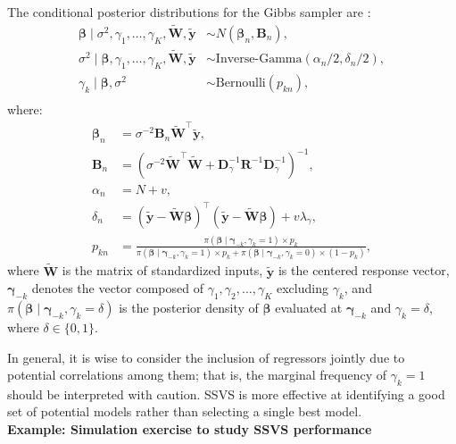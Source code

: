 The conditional posterior distributions for the Gibbs sampler are \cite{george1993variable}:
\begin{align*}
	\boldsymbol{\beta} \mid \sigma^2, \gamma_1, \dots, \gamma_K, \tilde{\mathbf{W}}, \tilde{\mathbf{y}} &\sim {N}(\boldsymbol{\beta}_n, \mathbf{B}_n), \\
	\sigma^2 \mid \boldsymbol{\beta}, \gamma_1, \dots, \gamma_K, \tilde{\mathbf{W}}, \tilde{\mathbf{y}} &\sim \text{Inverse-Gamma}(\alpha_n/2, \delta_n/2), \\
	\gamma_k \mid \boldsymbol{\beta}, \sigma^2 &\sim \text{Bernoulli}(p_{kn}),\\
\end{align*}
where:
\begin{align*}
	\boldsymbol{\beta}_n &= \sigma^{-2} \mathbf{B}_n \tilde{\mathbf{W}}^{\top} \tilde{\mathbf{y}}, \\
	\mathbf{B}_n &= \left(\sigma^{-2} \tilde{\mathbf{W}}^{\top} \tilde{\mathbf{W}} + \mathbf{D}_{\gamma}^{-1}\mathbf{R}^{-1}\mathbf{D}_{\gamma}^{-1} \right)^{-1}, \\
	\alpha_n &= N + v, \\
	\delta_n &= (\tilde{\mathbf{y}} - \tilde{\mathbf{W}} \boldsymbol{\beta})^{\top} (\tilde{\mathbf{y}} - \tilde{\mathbf{W}} \boldsymbol{\beta}) + v\lambda_{\gamma}, \\
	p_{kn} &= \frac{\pi(\boldsymbol{\beta}\mid \boldsymbol{\gamma}_{-k},\gamma_k=1)\times p_k}{\pi(\boldsymbol{\beta}\mid \boldsymbol{\gamma}_{-k},\gamma_k=1)\times p_k+\pi(\boldsymbol{\beta}\mid \boldsymbol{\gamma}_{-k},\gamma_k=0)\times (1-p_k)},
\end{align*}
where \(\tilde{\mathbf{W}}\) is the matrix of standardized inputs, \(\tilde{\mathbf{y}}\) is the centered response vector, \(\boldsymbol{\gamma}_{-k}\) denotes the vector composed of \(\gamma_1, \gamma_2, \dots, \gamma_K\) excluding \(\gamma_k\), and \(\pi(\boldsymbol{\beta} \mid \boldsymbol{\gamma}_{-k}, \gamma_k = \delta)\) is the posterior density of \(\boldsymbol{\beta}\) evaluated at \(\boldsymbol{\gamma}_{-k}\) and \(\gamma_k = \delta\), where \(\delta \in \{0,1\}\).

In general, it is wise to consider the inclusion of regressors jointly due to potential correlations among them; that is, the marginal frequency of \(\gamma_k = 1\) should be interpreted with caution. SSVS is more effective at identifying a good set of potential models rather than selecting a single best model.\\

\textbf{Example: Simulation exercise to study SSVS performance}

